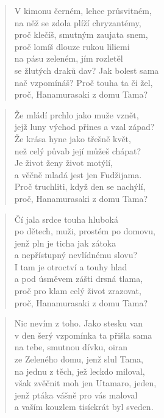 \documentclass{book}
\begin{document}
\begin{verse}
V kimonu černém, lehce průsvitném,\\
na něž se zdola plíží chryzantémy,\\
proč klečíš, smutným zaujata snem,\\
proč lomíš dlouze rukou liliemi\\
na pásu zeleném, jím rozletěl\\
se žlutých draků dav? Jak bolest sama\\
nač vzpomínáš? Proč touha ta či žel,\\
proč, Hanamurasaki z domu Tama?
\end{verse}
\begin{verse}
Že mládí prchlo jako muže vznět,\\
jejž luny východ přines a vzal západ?\\
Že krása hyne jako třešně květ,\\
než celý půvab její můžeš chápat?\\
Je život ženy život motýlí,\\
a věčně mladá jest jen Fudžijama.\\
Proč truchliti, když den se nachýlí,\\
proč, Hanamurasaki z domu Tama?
\end{verse}
\begin{verse}
Čí jala srdce touha hluboká\\
po dětech, muži, prostém po domovu,\\
jenž pln je ticha jak zátoka\\
a nepřístupný nevlídnému slovu?\\
I tam je otroctví a touhy hlad\\
a pod úsměvem zášti drsná tlama,\\
proč pro klam celý život zrazovat,\\
proč, Hanamurasaki z domu Tama?
\end{verse}
\begin{verse}
Nic nevím z toho. Jako stesku van\\
v den šerý vzpomínka ta přišla sama\\
na tebe, smutnou dívku, oiran\\
ze Zeleného domu, jenž slul Tama,\\
na jednu z těch, jež leckdo miloval,\\
však zvěčnit moh jen Utamaro, jeden,\\
jenž ptáka vášně pro vás maloval\\
a vaším kouzlem tisíckrát byl sveden.
\end{verse}
\end{document}
